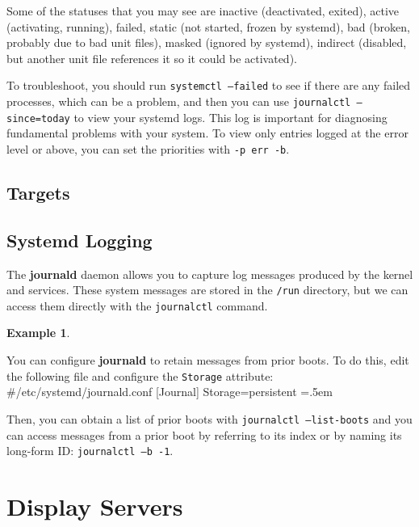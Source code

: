 \documentclass{article}
\theoremstyle{definition}
\newtheorem{example}{Example}[section]
\newenvironment{cverbatim}
    {\SaveVerbatim{cverb}}
    {\endSaveVerbatim
    \flushleft\fboxrule=0pt\fboxsep=.5em
    \colorbox{cverbbg}{%
      \makebox[\dimexpr\linewidth-2\fboxsep][l]{\BUseVerbatim{cverb}}%
    }
    \endflushleft
  }
\begin{document}
    Some of the statuses that you may see are inactive (deactivated, exited), active (activating, running), failed, static (not started, frozen by systemd), bad (broken, probably due to bad unit files), masked (ignored by systemd), indirect (disabled, but another unit file references it so it could be activated). 

    To troubleshoot, you should run \texttt{systemctl --failed} to see if there are any failed processes, which can be a problem, and then you can use \texttt{journalctl --since=today} to view your systemd logs. This log is important for diagnosing fundamental problems with your system. To view only entries logged at the error level or above, you can set the priorities with \texttt{-p err -b}. 

  \subsection{Targets}

    
  \subsection{Systemd Logging}

    The \textbf{journald} daemon allows you to capture log messages produced by the kernel and services. These system messages are stored in the \texttt{/run} directory, but we can access them directly with the \texttt{journalctl}  command. 

    \begin{example}
      
    \end{example}

    You can configure \textbf{journald} to retain messages from prior boots. To do this, edit the following file and configure the \texttt{Storage} attribute: 
    \begin{cverbatim}
    #/etc/systemd/journald.conf
      [Journal]
      Storage=persistent
    \end{cverbatim}

    Then, you can obtain a list of prior boots with \texttt{journalctl --list-boots} and you can access messages from a prior boot by referring to its index or by naming its long-form ID: \texttt{journalctl --b -1}. 

\section{Display Servers}
\end{document}
